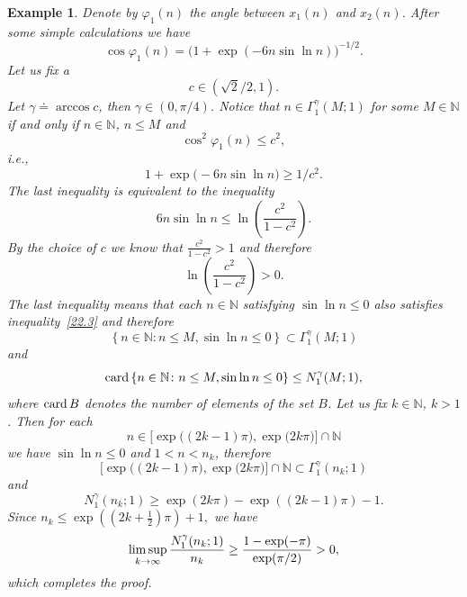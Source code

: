 \documentclass[11pt]{article}
\newtheorem{example}[theorem]{Example}
\begin{document}
\begin{example}
\textrm{Denote by $\varphi _{1}(n)$ the angle between $x_{1}( n) $
and $x_{2}( n) $. After some simple calculations we have 
\begin{equation*}
\cos \varphi _{1}(n)=\bigl(1+\exp (-6n\sin \ln n)\bigr)^{-1/2}.
\end{equation*}%
Let us fix a 
\begin{equation}
c\in ( \sqrt{2}/2,1) .  \label{22.2}
\end{equation}%
Let $\gamma \doteq \arccos c$, then $\gamma \in (0,\pi /4)$. Notice that $%
n\in \Gamma _{1}^{\gamma }(M;1)$ for some $M\in \mathbb{N}$ if and only if $%
n\in \mathbb{N}$, $n\le M$ and 
\begin{equation*}
\cos ^{2}\varphi _{1}(n)\le c^{2},
\end{equation*}%
i.e.,%
\begin{equation*}
1+\exp \bigl(-6n\sin \ln n\bigr)\ge 1/c^{2}.
\end{equation*}%
The last inequality is equivalent to the inequality%
\begin{equation}
6n\sin \ln n\le \ln \left( \frac{c^{2}}{1-c^{2}}\right) .  \label{22.3}
\end{equation}%
By the choice of $c$ we know that $\frac{c^{2}}{1-c^{2}}>1$ and therefore 
\begin{equation*}
\ln \left( \frac{c^{2}}{1-c^{2}}\right) >0.
\end{equation*}%
The last inequality means that each $n\in \mathbb{N}$ satisfying $\sin \ln
n\le 0$ 
also satisfies inequality~\eqref{22.3}
 and therefore 
\begin{equation*}
\left\{ n\in \mathbb{N}\colon n\le M,\sin \ln n\le 0\right\} \subset
\Gamma _{1}^{\gamma }( M;1)
\end{equation*}%
and%
\begin{equation*}
\mathop{\rm card}\left\{ n\in \mathbb{N}\colon n\le M,\sin \ln n\le
0\right\} \le N_{1}^{\gamma }( M;1) ,
\end{equation*}%
where $\mathop{\rm card}B$ denotes the number of elements of the set $B$.
Let us fix $k\in \mathbb{N}$, $k>1$. Then for each 
\begin{equation*}
n\in \bigl[\exp \bigl((2k-1)\pi \bigr),\exp \bigl(2k\pi \bigr)\bigr]\cap 
\mathbb{N}
\end{equation*}%
we have $\sin \ln n\le 0$ and $1<n<n_{k}$, therefore 
\begin{equation*}
\bigl[\exp \bigl((2k-1)\pi \bigr),\exp \bigl(2k\pi \bigr)\bigr]\cap \mathbb{N%
}\subset \Gamma _{1}^{\gamma }( n_{k};1)
\end{equation*}%
and}%
\begin{equation*}
N_{1}^{\gamma }( n_{k};1) \ge \exp ( 2k\pi ) -\exp
( ( 2k-1) \pi ) -1.
\end{equation*}%
Since $n_{k}\le \exp \left( \left( 2k+\frac{1}{2}\right) \pi \right) +1,$
we have 
\begin{equation*}
\limsup_{k\to \infty }\frac{N_{1}^{\gamma }( n_{k};1) }{%
n_{k}}\ge \frac{1-\exp ( -\pi ) }{\exp ( \pi /2) }>0,
\end{equation*}%
which completes the proof. 
\end{example}
\end{document}
